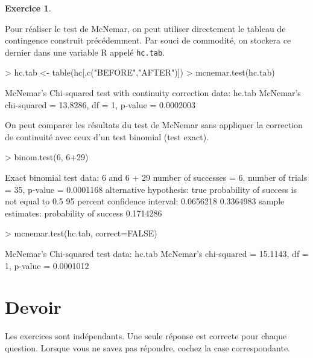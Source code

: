\documentclass[11pt]{report}
\theoremstyle{definition}
\newtheorem{exo}{Exercice}[chapter]
\newcommand{\R}{\textsf{R}\xspace}
\begin{document}
\begin{exo}
\begin{sol}
Pour réaliser le test de McNemar, on peut utiliser directement le tableau de
contingence construit précédemment. Par souci de commodité, on stockera ce
dernier dans une variable \R appelé \texttt{hc.tab}.
\begin{Schunk}
\begin{Sinput}
> hc.tab <- table(hc[,c("BEFORE","AFTER")])
> mcnemar.test(hc.tab)
\end{Sinput}
\begin{Soutput}
	McNemar's Chi-squared test with continuity correction
data:  hc.tab 
McNemar's chi-squared = 13.8286, df = 1, p-value = 0.0002003
\end{Soutput}
\end{Schunk}

On peut comparer les résultats du test de McNemar sans appliquer la
correction de continuité avec ceux d'un test binomial (test exact).
\begin{Schunk}
\begin{Sinput}
> binom.test(6, 6+29)
\end{Sinput}
\begin{Soutput}
	Exact binomial test
data:  6 and 6 + 29 
number of successes = 6, number of trials = 35, p-value = 0.0001168
alternative hypothesis: true probability of success is not equal to 0.5 
95 percent confidence interval:
 0.0656218 0.3364983 
sample estimates:
probability of success 
             0.1714286 
\end{Soutput}
\begin{Sinput}
> mcnemar.test(hc.tab, correct=FALSE)
\end{Sinput}
\begin{Soutput}
	McNemar's Chi-squared test
data:  hc.tab 
McNemar's chi-squared = 15.1143, df = 1, p-value = 0.0001012
\end{Soutput}
\end{Schunk}
\end{sol}
\end{exo}


\chapter*{Devoir }

Les exercices sont indépendants. Une seule réponse est correcte pour chaque
question. Lorsque vous ne savez pas répondre, cochez la case correspondante.
\end{document}
